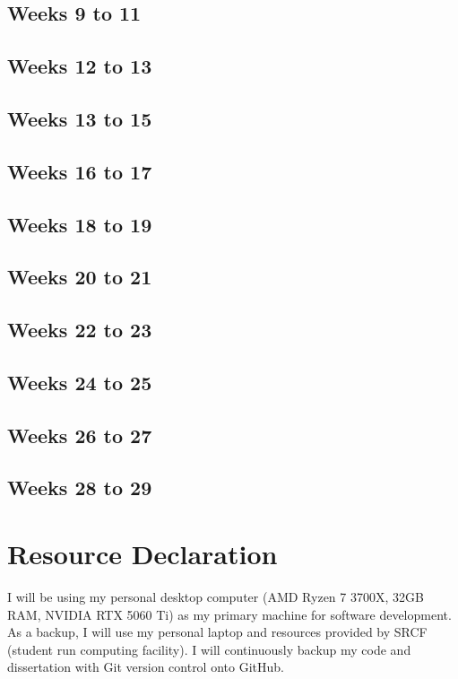 \documentclass[20pt]{article}
\begin{document}
\subsection*{Weeks 9 to 11}

\subsection*{Weeks 12 to 13}

\subsection*{Weeks 13 to 15}

\subsection*{Weeks 16 to 17}

\subsection*{Weeks 18 to 19}

\subsection*{Weeks 20 to 21}

\subsection*{Weeks 22 to 23}
\subsection*{Weeks 24 to 25}

\subsection*{Weeks 26 to 27}
\subsection*{Weeks 28 to 29}

\section{Resource Declaration}

 I will be using my personal desktop computer (AMD Ryzen 7 3700X, 32GB RAM, NVIDIA RTX 5060 Ti) as my primary
 machine for software development. As a backup, I will use my personal laptop and resources provided by SRCF (student run computing facility). I will continuously backup my code and dissertation with Git version control onto GitHub.

\pagebreak
\end{document}

